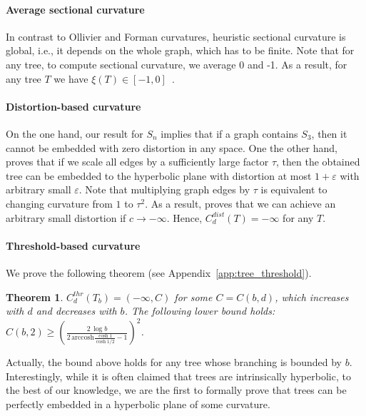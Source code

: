 \documentclass{article} %
\newtheorem{theorem}{Theorem}[section]
\begin{document}

\paragraph{Average sectional curvature} In contrast to Ollivier and Forman curvatures, heuristic sectional curvature is global, i.e., it depends on the whole graph, which has to be finite. Note that for any tree, to compute sectional curvature, we average 0 and -1. As a result, for any tree $T$ we have $\xi(T) \in [-1,0]$~\citep{gu2019learning}.

\paragraph{Distortion-based curvature} 

On the one hand, our result for $S_n$ implies that if a graph contains $S_3$, then it cannot be embedded with zero distortion in any space. One the other hand, \citet{sarkar2011low} proves that if we scale all edges by a sufficiently large factor $\tau$, then the obtained tree can be embedded to the hyperbolic plane with distortion at most $1 + \varepsilon$ with arbitrary small $\varepsilon$. Note that multiplying graph edges by $\tau$ is equivalent to changing curvature from $1$ to $\tau^2$. As a result, \citet{sarkar2011low} proves that we can achieve an arbitrary small distortion if $c \to -\infty$.
Hence, $C_d^{dist}(T) = -\infty$ for any $T$.

\paragraph{Threshold-based curvature} 

We prove the following theorem (see Appendix~\ref{app:tree_threshold}).

\begin{theorem}\label{thm:tree_threshold}
$C_d^{thr}(T_b) = (-\infty, C)$ for some $C = C(b,d)$, which increases with $d$ and decreases with $b$. 
The following lower bound holds: $C(b,2) \ge \left( \frac{2\,\log b}{2 \, \mathrm{arccosh} \frac{\cosh 1}{\cosh 1/2} - 1} \right)^2$.
\end{theorem}

Actually, the bound above holds for any tree whose branching is bounded by $b$.
Interestingly, while it is often claimed that trees are intrinsically hyperbolic, to the best of our knowledge, we are the first to formally prove that trees can be perfectly embedded in a hyperbolic plane of some curvature.  
\end{document}
